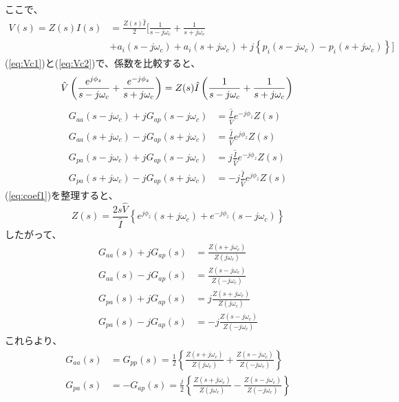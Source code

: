 \documentclass[book]{jlreq}
\begin{document}
%
ここで、
%
\begin{equation}
    \begin{split}
        V(s) = Z(s) I(s) &= \frac{Z(s)\hat{I}}{2} \biggl [\frac{1}{s-j\omega_c}+\frac{1}{s+j\omega_c} \\ 
        &+ a_i(s - j\omega_c) + a_i(s+j\omega_c) + j\left \{p_i(s-j\omega_c)-p_i(s+j\omega_c) \right \} \biggr ]
    \end{split}
    \label{eq:Vc2}
\end{equation}
%
(\ref{eq:Vc1})と(\ref{eq:Vc2})で、係数を比較すると、
%
\begin{equation} 
    \hat{V}\left(\frac{e^{j\phi_z}}{s-j\omega_c} + \frac{e^{-j\phi_z}}{s+j\omega_c} \right) =
    Z(s)\hat{I}\left(\frac{1}{s-j\omega_c} + \frac{1}{s+j\omega_c}  \right) \\
    \label{eq:coef1}
\end{equation}
%
\begin{equation}
    \begin{split}
        G_{aa}(s-j\omega_c) + j G_{ap}(s-j\omega_c) &= \frac{\hat{I}}{\hat{V}}e^{-j\phi_z}Z(s) \\
        G_{aa}(s+j\omega_c) - j G_{ap}(s+j\omega_c) &= \frac{\hat{I}}{\hat{V}}e^{j\phi_z}Z(s) \\
        G_{pa}(s-j\omega_c) + j G_{ap}(s-j\omega_c) &= j \frac{\hat{I}}{\hat{V}}e^{-j\phi_z}Z(s) \\
        G_{pa}(s+j\omega_c) - j G_{ap}(s+j\omega_c) &= -j \frac{\hat{I}}{\hat{V}}e^{j\phi_z}Z(s) 
    \end{split}
\end{equation}
%
(\ref{eq:coef1})を整理すると、
%
\begin{equation}
    Z(s) = \frac{2 s \hat{V}}{\hat{I}}\left\{e^{j\phi_z}(s+j\omega_c)+e^{-j\phi_z}(s-j\omega_c)\right\}
\end{equation}
%
したがって、
%
\begin{equation}
    \begin{split}
        G_{aa}(s) + j G_{ap}(s) &= \frac{Z(s+j\omega_c)}{Z(j\omega_c)} \\
        G_{aa}(s) - j G_{ap}(s) &= \frac{Z(s-j\omega_c)}{Z(-j\omega_c)} \\
        G_{pa}(s) + j G_{ap}(s) &= j \frac{Z(s+j\omega_c)}{Z(j\omega_c)} \\
        G_{pa}(s) - j G_{ap}(s) &= -j \frac{Z(s-j\omega_c)}{Z(-j\omega_c)} 
    \end{split}
\end{equation}
%
これらより、
%
\begin{equation}
    \begin{split}
        G_{aa}(s) &= G_{pp}(s)  = \frac{1}{2}\left\{\frac{Z(s+j\omega_c)}{Z(j\omega_c)} + \frac{Z(s-j\omega_c)}{Z(-j\omega_c)}\right\} \\
        G_{pa}(s) &= - G_{ap}(s) = \frac{j}{2}\left\{\frac{Z(s+j\omega_c)}{Z(j\omega_c)} - \frac{Z(s-j\omega_c)}{Z(-j\omega_c)}\right\}
    \end{split}
\end{equation}
\end{document}
